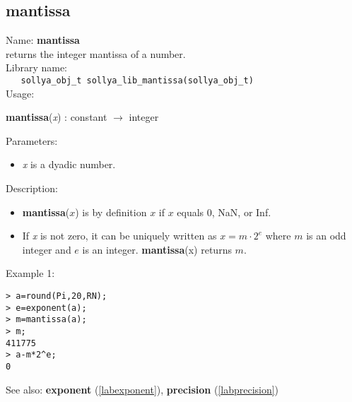 \subsection{mantissa}
\label{labmantissa}
\noindent Name: \textbf{mantissa}\\
\phantom{aaa}returns the integer mantissa of a number.\\[0.2cm]
\noindent Library name:\\
\verb|   sollya_obj_t sollya_lib_mantissa(sollya_obj_t)|\\[0.2cm]
\noindent Usage: 
\begin{center}
\textbf{mantissa}(\emph{x}) : \textsf{constant} $\rightarrow$ \textsf{integer}\\
\end{center}
Parameters: 
\begin{itemize}
\item \emph{x} is a dyadic number.
\end{itemize}
\noindent Description: \begin{itemize}

\item \textbf{mantissa}($x$) is by definition $x$ if $x$ equals 0, NaN, or Inf.

\item If \emph{x} is not zero, it can be uniquely written as $x = m \cdot 2^e$ where
   $m$ is an odd integer and $e$ is an integer. \textbf{mantissa}(x) returns $m$. 
\end{itemize}
\noindent Example 1: 
\begin{center}\begin{minipage}{15cm}\begin{Verbatim}[frame=single,commandchars=\\\|\~]
> a=round(Pi,20,RN);
> e=exponent(a);
> m=mantissa(a);
> m;
411775
> a-m*2^e;
0
\end{Verbatim}
\end{minipage}\end{center}
See also: \textbf{exponent} (\ref{labexponent}), \textbf{precision} (\ref{labprecision})
